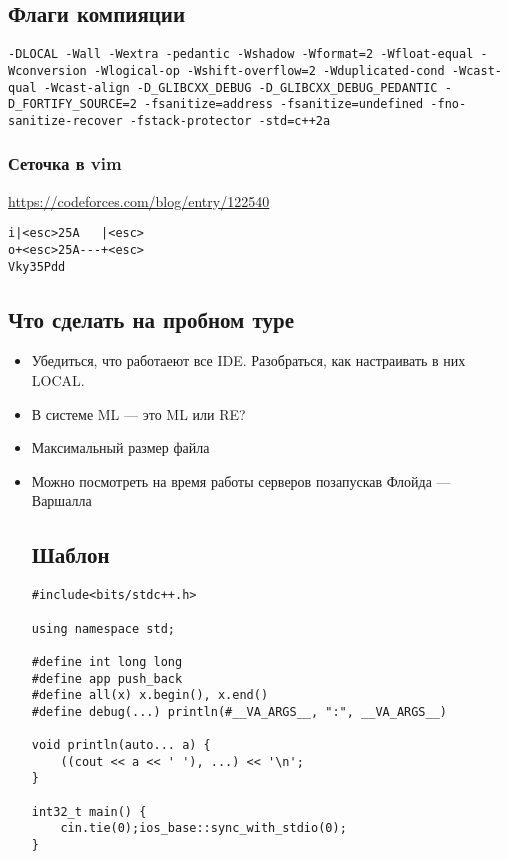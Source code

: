 \subsection{Флаги компияции}
\texttt{-DLOCAL -Wall -Wextra -pedantic -Wshadow -Wformat=2 -Wfloat-equal -Wconversion -Wlogical-op -Wshift-overflow=2 -Wduplicated-cond -Wcast-qual -Wcast-align -D\_GLIBCXX\_DEBUG -D\_GLIBCXX\_DEBUG\_PEDANTIC -D\_FORTIFY\_SOURCE=2 -fsanitize=address -fsanitize=undefined -fno-sanitize-recover -fstack-protector -std=c++2a}
\subsubsection{Сеточка в vim}
\underline{\url{https://codeforces.com/blog/entry/122540}}

\begin{lstlisting}
i|<esc>25A   |<esc>
o+<esc>25A---+<esc>
Vky35Pdd
\end{lstlisting}
\subsection{Что сделать на пробном туре}
\begin{itemize}
\item Убедиться, что работаеют все IDE.
Разобраться, как настраивать в них LOCAL.
\item В системе ML --- это ML или RE?
\item Максимальный размер файла
\item Можно посмотреть на время работы серверов позапускав Флойда --- Варшалла
\subsection{Шаблон}
\begin{lstlisting}
#include<bits/stdc++.h>

using namespace std;

#define int long long
#define app push_back
#define all(x) x.begin(), x.end()
#define debug(...) println(#__VA_ARGS__, ":", __VA_ARGS__)

void println(auto... a) {
    ((cout << a << ' '), ...) << '\n';
}

int32_t main() {
    cin.tie(0);ios_base::sync_with_stdio(0);
}
\end{lstlisting}
\end{itemize}